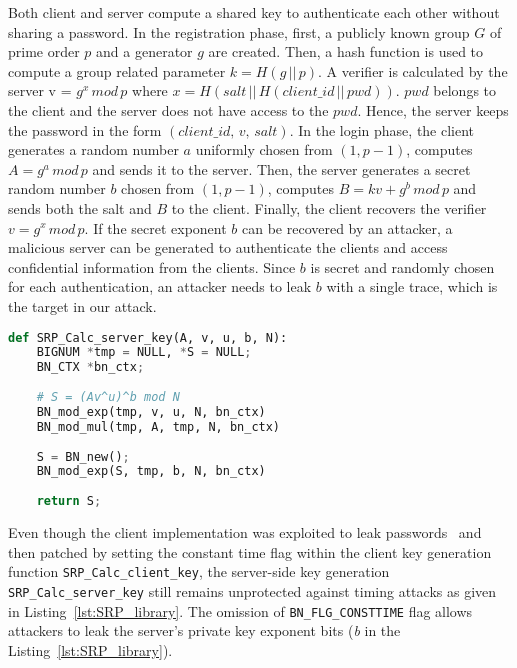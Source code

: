 Both client and server compute a shared key to authenticate each other without sharing a password. In the registration phase, first, a publicly known group $G$ of prime order $p$ and a generator $g$ are created. Then, a hash function is used to compute a group related parameter $k=H(g\,||\,p)$. A verifier is calculated by the server v = $g^x\,mod\,p$ where $x = H(salt\,||\, H(client\_id\,||\,pwd))$. $pwd$ belongs to the client and the server does not have access to the $pwd$. Hence, the server keeps the password in the form $(client\_id,\,v,\,salt)$. In the login phase, the client generates a random number $a$ uniformly chosen from $(1,p-1)$, computes $A=g^a \,mod\,p$ and sends it to the server. Then, the server generates a secret random number $b$ chosen from $(1, p-1)$, computes $B=kv + g^b\,mod \,p$ and sends both the salt and $B$ to the client. Finally, the client recovers the verifier $v = g^x\,mod\,p$. If the secret exponent $b$ can be recovered by an attacker, a malicious server can be generated to authenticate the clients and access confidential information from the clients. Since $b$ is secret and randomly chosen for each authentication, an attacker needs to leak $b$ with a single trace, which is the target in our attack.
\begin{lstlisting}[caption={Implementation of the \texttt{SRP\_Calc\_server\_key} function in OpenSSL v1.1.1w SRP library.}, label=lst:SRP_library, language=Python, basicstyle=\ttfamily\scriptsize, basewidth={.48em}, backgroundcolor=\color{white}]
def SRP_Calc_server_key(A, v, u, b, N):
    BIGNUM *tmp = NULL, *S = NULL;
    BN_CTX *bn_ctx;
    
    # S = (Av^u)^b mod N
    BN_mod_exp(tmp, v, u, N, bn_ctx)
    BN_mod_mul(tmp, A, tmp, N, bn_ctx)
    
    S = BN_new();
    BN_mod_exp(S, tmp, b, N, bn_ctx) 
    
    return S; 
\end{lstlisting}

Even though the client implementation was exploited to leak passwords~\cite{de2021parasite} and then patched by setting the constant time flag within the client key generation function \texttt{SRP\_Calc\_client\_key}, the server-side key generation \texttt{SRP\_Calc\_server\_key} still remains unprotected against timing attacks as given in Listing~\ref{lst:SRP_library}. The omission of \texttt{BN\_\allowbreak FLG\_\allowbreak CONSTTIME} flag allows attackers to leak the server's private key exponent bits (\textit{b} in the Listing~\ref{lst:SRP_library}).

